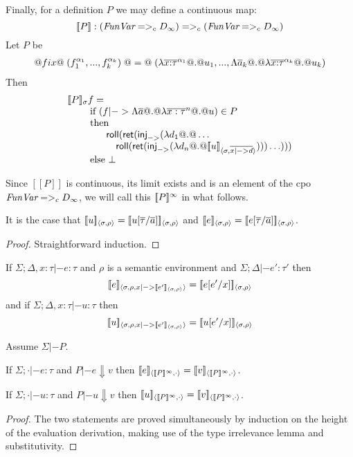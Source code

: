 \documentclass[preprint,nocopyrightspace]{sigplanconf}
\begin{document}
Finally, for a definition $P$ we may define a continuous map:
\[ 
        [\![P]\!] : (\textit{FunVar} =>_c D_{\infty}) =>_c (\textit{FunVar} =>_c D_{\infty}) 
\]
Let $P$ be 
\[\begin{array}{l} 
     @fix@\;(f_1^{\alpha_1},...,f_k^{\alpha_k})\;@=@\; 
     (\lambda{\overline{x{:}\tau}^{\alpha_1}} @.@ u_1,...,
                   \Lambda\overline{a}_k @.@ \lambda{\overline{x{:}\tau}^{\alpha_k}} @.@ u_k) 
\end{array}\] 
Then
\[\begin{array}{l}  
   [\![P]\!]_{\sigma} f =  \\ 
     \qquad\mbox{ if } (f |-> \Lambda\overline{a} @.@ \lambda\overline{x:\tau}^{n} @.@ u) \in P \\
     \qquad\mbox{ then } \\
     \qquad\quad\quad \mathsf{roll}(\mathsf{ret}(\mathsf{inj}_{->}(\mathsf{\lambda} d_1 @.@ \ldots  \\
     \qquad\quad\quad\quad \mathsf{roll}(\mathsf{ret}(\mathsf{inj}_{->}(\mathsf{\lambda} d_n @.@ [\![u]\!]_{\langle {\sigma},{\overline{x |-> d}}\rangle})))\ldots))) \\
     \qquad \mbox{ else } \bot
\end{array}\]

Since $[\![P]\!]$ is continuous, its limit exists and is an element of the cpo $\textit{FunVar} =>_c D_{\infty}$, 
we will call this $[\![P]\!]^{\infty}$ in what follows.


\begin{lemma}
It is the case that $[\![u]\!]_{\langle {\sigma},{\rho}\rangle} = [\![u[\overline{\tau}/\overline{a}]]\!]_{\langle {\sigma},{\rho}\rangle}$ 
and $[\![e]\!]_{\langle {\sigma},{\rho}\rangle} = [\![e[\overline{\tau}/\overline{a}]]\!]_{\langle {\sigma},{\rho}\rangle}$.
\end{lemma}
\begin{proof} Straightforward induction. \end{proof}

\begin{lemma}[Substitutivity]
If $\Sigma;\Delta,x{:}\tau |- e : \tau$ and $\rho$ is a semantic environment 
and $\Sigma;\Delta |- e' : \tau'$ then 
\[ [\![e]\!]_{\langle {\sigma},{\rho,x |-> [\![e']\!]_{\langle {\sigma},{\rho}\rangle}}\rangle} = [\![e[e'/x]]\!]_{\langle {\sigma},{\rho}\rangle} \]
and if $\Sigma;\Delta,x{:}\tau |- u : \tau$ then 
\[ [\![u]\!]_{\langle {\sigma},{\rho,x |-> [\![e']\!]_{\langle {\sigma},{\rho}\rangle}}\rangle} = [\![u[e'/x]]\!]_{\langle {\sigma},{\rho}\rangle} \]
\end{lemma}

\begin{lemma}
Assume $\Sigma |- P$. 
\begin{itemize*} 
  \item If $\Sigma;\cdot |- e : \tau$ and $P |- e \Downarrow v$ then $\interp{e}{\dbrace{P}^{\infty}}{\cdot} = \interp{v}{\dbrace{P}^{\infty}}{\cdot}$.
  \item If $\Sigma;\cdot |- u : \tau$ and $P |- u \Downarrow v$ then $\interp{u}{\dbrace{P}^{\infty}}{\cdot} = \interp{v}{\dbrace{P}^{\infty}}{\cdot}$.
\end{itemize*} 
\end{lemma} 
\begin{proof} The two statements are proved simultaneously by induction on the height of the evaluation derivation, making use
of the type irrelevance lemma and substitutivity.
\end{proof}
\end{document}
